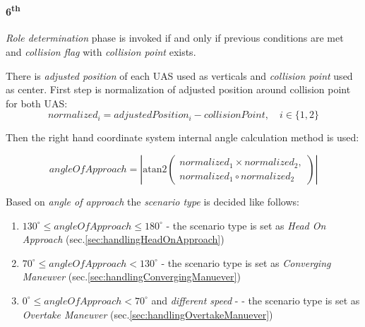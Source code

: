 \paragraph{6\textsuperscript{th}} \emph{Role determination} phase is invoked if and only if previous conditions are met and \emph{collision flag} with \emph{collision point} exists.

There is \emph{adjusted position} of each UAS used as verticals and \emph{collision point} used as center. First step is normalization of adjusted position around collision point for both UAS:
\begin{equation}
    normalized_i =  adjustedPosition_i - collisionPoint,\quad i \in \{1, 2\}
\end{equation}

Then the right hand coordinate system internal angle calculation method is used:


\begin{equation}
    angleOfApproach = \left|\text{atan2}\left(\begin{gathered}normalized_1 \times normalized_2, \\normalized_1 \circ normalized_2\end{gathered}\right)\right|
\end{equation}

\noindent Based on \emph{angle of approach} the \emph{scenario type} is  decided like follows:
\begin{enumerate}
    \item $130^\circ \le angle Of Approach  \le 180^\circ$ - the scenario type is set as \emph{Head On Approach} (sec.\ref{sec:handlingHeadOnApproach})
    \item $70^\circ \le angle Of Approach  < 130^\circ$ - the scenario type is set as \emph{Converging Maneuver} (sec.\ref{sec:handlingConvergingManuever})
    \item $0^\circ \le angle Of Approach  < 70^\circ$ and \emph{different speed} -   - the scenario type is set as \emph{Overtake Maneuver} (sec.\ref{sec:handlingOvertakeManuever})
\end{enumerate}

